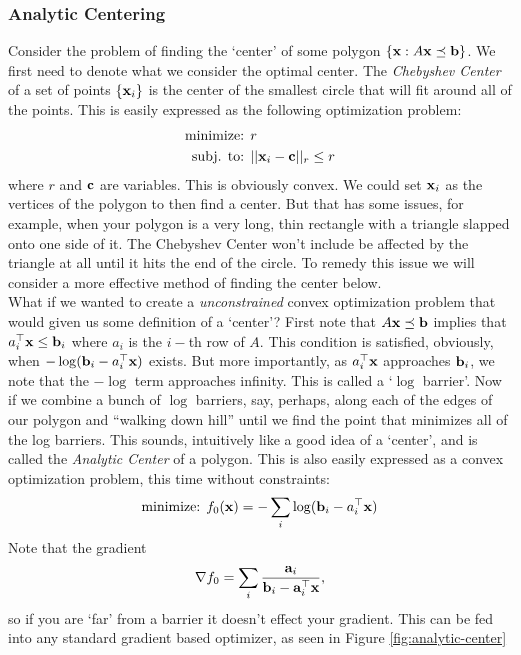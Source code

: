\documentclass{article}
\begin{document}
\subsubsection{Analytic Centering}

Consider the problem of finding the `center' of some
polygon $\{{\bf x} : A{\bf x} \preceq {\bf b}\}$. We first need to denote
what we consider the optimal center. The \textit{Chebyshev Center}
of a set of points $\{{\bf x}_i\}$ is the center of the smallest
circle that will fit around all of the points. This is easily
expressed as the following optimization problem:
\begin{align*}
    \text{minimize: } & r\\
    \text{subj. to: } & ||{\bf x}_i - {\bf c}||_r \leq r\\
\end{align*}
where $r$ and ${\bf c}$ are variables. This is obviously convex.
We could set ${\bf x}_i$ as the vertices of the polygon to then find a
center. But that has some issues, for example, when your polygon
is a very long, thin rectangle with a triangle slapped onto one side
of it. The Chebyshev Center won't include be affected by the triangle
at all until it hits the end of the circle. To remedy this issue we
will consider a more effective method of finding the center below.\\

What if we wanted to create
a \textit{unconstrained} convex optimization problem that would
given us some definition of a `center'? First note that $A{\bf x} \preceq {\bf b}$
implies that $a_i^\top{\bf x} \leq {\bf b}_i$ where $a_i$ is the $i-$th row
of $A$. This condition is satisfied, obviously, when $-\log ({\bf b}_i - a_i^\top{\bf x})$
exists. But more importantly, as $a_i^\top{\bf x}$ approaches ${\bf b}_i$, we
note that the $-\log$ term approaches infinity. This is called a
`$\log$ barrier'. Now if we combine a bunch of $\log$ barriers, say,
perhaps, along each of the edges of our polygon and ``walking down
hill'' until we find the point that minimizes all of the log barriers. This
sounds, intuitively like a good idea of a `center', and is called the
\textit{Analytic Center} of a polygon. This is also easily expressed as
a convex optimization problem, this time without constraints:
\begin{align*}
    \text{minimize: } f_0({\bf x}) = -\sum_{i}\log({\bf b}_i - a_i^\top{\bf x})\\
\end{align*}
Note that the gradient
\[
    \nabla f_0 = \sum_i\frac{{\bf a}_i}{{\bf b}_i - {\bf a}_i^\top{\bf x}},
\]
so if you are `far' from a barrier it doesn't effect your gradient. This
can be fed into any standard gradient based optimizer, as seen in Figure
\ref{fig:analytic-center}\\
\end{document}
